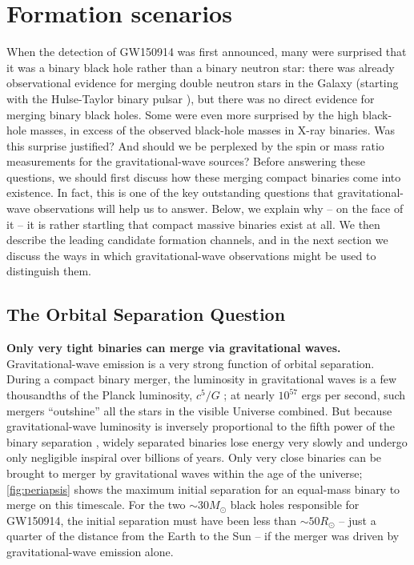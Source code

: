 \documentclass[review]{elsarticle}
\begin{document}
\section{Formation scenarios}\label{form}

When the detection of GW150914 was first announced, many were surprised that it was a binary black hole rather than a binary neutron star: there was already observational evidence for merging double neutron stars in the Galaxy (starting with the Hulse-Taylor binary pulsar \citep{HulseTaylor:1975}), but there was no direct evidence for merging binary black holes. Some were even more surprised by the high black-hole masses, in excess of the observed black-hole masses in X-ray binaries. Was this surprise justified? And should we be perplexed by the spin or mass ratio measurements for the gravitational-wave sources? Before answering these questions, we should first discuss how these merging compact binaries come into existence. In fact, this is one of the key outstanding questions that gravitational-wave observations will help us to answer. Below, we explain why -- on the face of it -- it is rather startling that compact massive binaries exist at all. We then describe the leading candidate formation channels, and in the next section we discuss the ways in which gravitational-wave observations might be used to distinguish them.


\subsection{The Orbital Separation Question}


\textbf{Only very tight binaries can merge via gravitational waves.} Gravitational-wave emission is a very strong function of orbital separation. During a compact binary merger, the luminosity in gravitational waves is a few thousandths of the Planck luminosity, $c^5/G$ \citep[e.g.,][]{Cardoso:2018}; at nearly $10^{57}$ ergs per second, such mergers ``outshine'' all the stars in the visible Universe combined. But because gravitational-wave luminosity is inversely proportional to the fifth power of the binary separation \citep{Peters:1964}, widely separated binaries lose energy very slowly and undergo only negligible inspiral over billions of years. Only very close binaries can be brought to merger by gravitational waves within the age of the universe; \autoref{fig:periapsis} shows the maximum initial separation for an equal-mass binary to merge on this timescale. For the two $\sim 30 M_\odot$ black holes responsible for GW150914, the initial separation must have been less than $\sim 50 R_\odot$ -- just a quarter of the distance from the Earth to the Sun -- if the merger was driven by gravitational-wave emission alone.
\end{document}
